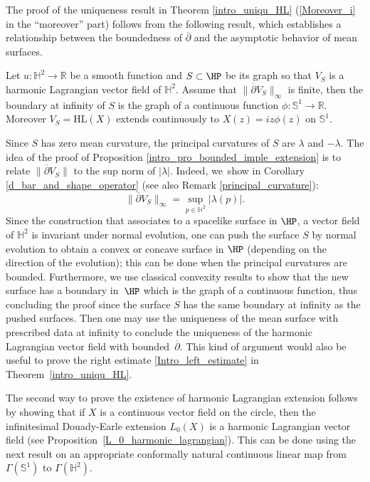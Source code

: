 The proof of the uniqueness result in Theorem \ref{intro_uniqu_HL} (\ie \eqref{Moreover_i}  in the ``moreover'' part) follows from the following result, which establishes a relationship between the boundedness of \(\overline{\partial} \) and the asymptotic behavior of mean surfaces.

\begin{prop}\label{intro_pro_bounded_imple_extension}
Let \(u: \mathbb{H}^2 \to \mathbb{R} \) be a smooth function and \(S \subset \HP \) be its graph so that \(V_S \) is a harmonic Lagrangian vector field of \(\mathbb{H}^2\). Assume that \(\lVert \overline{\partial} V_S \rVert_{\infty}\) is finite, then the boundary at infinity of \(S \) is the graph of a continuous function \(\phi: \mathbb{S}^1 \to \mathbb{R}\). Moreover $V_S=\mathrm{HL}(X)$ extends continuously to $X(z)=iz\phi(z)$ on $\mathbb{S}^1$.
\end{prop}

Since \(S \) has zero mean curvature, the principal curvatures of \(S \) are \(\lambda\) and \(-\lambda\). The idea of the proof of Proposition \ref{intro_pro_bounded_imple_extension} is to relate \(\lVert \overline{\partial} V_S \rVert\) to the sup norm of \(\lvert \lambda \rvert\). Indeed, we~show in Corollary \ref{d_bar_and_shape_operator} (see also Remark \ref{principal_curvature}):
\[
\lVert \overline{\partial} V_S \rVert_{\infty} = \sup_{p \in \mathbb{H}^2} \lvert \lambda(p) \rvert.
\]
Since the construction that associates to a spacelike surface in \(\HP\), a vector field of \(\mathbb{H}^2\) is invariant under normal evolution, one can push the surface \(S \) by normal evolution to obtain a convex or concave surface in \(\HP\) (depending on the direction of the evolution); this can be done when the principal curvatures are bounded. Furthermore, we use classical convexity results to show that the new surface has a boundary in~\(\HP\) which is the graph of a continuous function, thus concluding the proof since the surface \(S \) has the same boundary at infinity as the pushed surfaces. Then one may use the uniqueness of the mean surface with prescribed data at infinity to conclude the uniqueness of the harmonic Lagrangian vector field with bounded~\(\overline{\partial}\). This kind of argument would also be useful to prove the right estimate \eqref{Intro_left_estimate} in Theorem~\ref{intro_uniqu_HL}.

The second way to prove the existence of harmonic Lagrangian extension follows by showing that if \(X \) is a continuous vector field on the circle, then the infinitesimal Douady-Earle extension \(L_0(X) \) is a harmonic Lagrangian vector field (see Proposition~\ref{L_0_harmonic_lagrangian}). This can be done using the next result on an appropriate conformally natural continuous linear map from \(\Gamma(\mathbb{S}^1)\) to \(\Gamma(\mathbb{H}^2)\).

